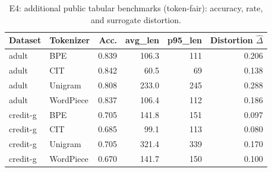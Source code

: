 \begin{table}[t]
\centering
\small
\begin{tabular}{llrrrr}
\toprule
Dataset & Tokenizer & Acc. & avg\_len & p95\_len & Distortion $\hat{\Delta}$ \\
\midrule
adult & BPE & 0.839 & 106.3 & 111 & 0.206 \\
adult & CIT & 0.842 & 60.5 & 69 & 0.138 \\
adult & Unigram & 0.808 & 233.0 & 245 & 0.288 \\
adult & WordPiece & 0.837 & 106.4 & 112 & 0.186 \\
credit-g & BPE & 0.705 & 141.8 & 151 & 0.097 \\
credit-g & CIT & 0.685 & 99.1 & 113 & 0.080 \\
credit-g & Unigram & 0.705 & 321.4 & 339 & 0.170 \\
credit-g & WordPiece & 0.670 & 141.7 & 150 & 0.100 \\
\bottomrule
\end{tabular}
\caption{E4: additional public tabular benchmarks (token-fair): accuracy, rate, and surrogate distortion.}
\label{tab:e4_uci}
\end{table}
